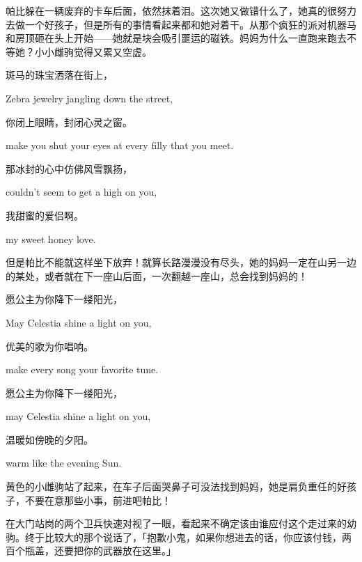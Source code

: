 帕比躲在一辆废弃的卡车后面，依然抹着泪。这次她又做错什么了，她真的很努力去做一个好孩子，但是所有的事情看起来都和她对着干。从那个疯狂的派对机器马和房顶砸在头上开始——她就是块会吸引噩运的磁铁。妈妈为什么一直跑来跑去不等她？小小雌驹觉得又累又空虚。

\begin{song}
斑马的珠宝洒落在街上，

Zebra jewelry jangling down the street,

\medskip

你闭上眼睛，封闭心灵之窗。

make you shut your eyes at every filly that you meet.

\medskip

那冰封的心中仿佛风雪飘扬，

couldn't seem to get a high on you,

\medskip

我甜蜜的爱侣啊。

my sweet honey love.
\end{song}

但是帕比不能就这样坐下放弃！就算长路漫漫没有尽头，她的妈妈一定在山另一边的某处，或者就在下一座山后面，一次翻越一座山，总会找到妈妈的！

\begin{song}
愿公主为你降下一缕阳光，

May Celestia shine a light on you,

\medskip

优美的歌为你唱响。

make every song your favorite tune.

\medskip

愿公主为你降下一缕阳光，

may Celestia shine a light on you,

\medskip

温暖如傍晚的夕阳。

warm like the evening Sun.
\end{song}

黄色的小雌驹站了起来，在车子后面哭鼻子可没法找到妈妈，她是肩负重任的好孩子，不要在意那些小事，前进吧帕比！

\horizonline


在大门站岗的两个卫兵快速对视了一眼，看起来不确定该由谁应付这个走过来的幼驹。终于比较大的那个说话了，「抱歉小鬼，如果你想进去的话，你应该付钱，两百个瓶盖，还要把你的武器放在这里。」

